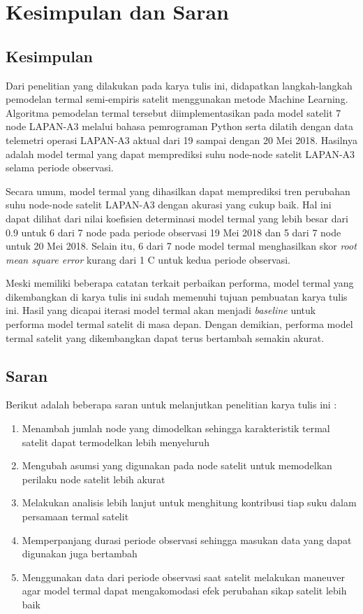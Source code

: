 \chapter{Kesimpulan dan Saran}

\section{Kesimpulan}

Dari penelitian yang dilakukan pada karya tulis ini, didapatkan langkah-langkah
pemodelan termal semi-empiris satelit menggunakan metode Machine Learning.
Algoritma pemodelan termal tersebut diimplementasikan pada model satelit 7 node
LAPAN-A3 melalui bahasa pemrograman Python serta dilatih dengan data telemetri
operasi LAPAN-A3 aktual dari 19 sampai dengan 20 Mei 2018. Hasilnya adalah model
termal yang dapat memprediksi suhu node-node satelit LAPAN-A3 selama periode
observasi.

Secara umum, model termal yang dihasilkan dapat memprediksi tren perubahan suhu
node-node satelit LAPAN-A3 dengan akurasi yang cukup baik. Hal ini dapat
dilihat dari nilai koefisien determinasi model termal yang lebih besar dari 0.9
untuk 6 dari 7 node pada periode observasi 19 Mei 2018 dan 5 dari 7 node untuk
20 Mei 2018. Selain itu, 6 dari 7 node model termal menghasilkan skor
\textit{root mean square error} kurang dari 1 \degree C untuk kedua periode observasi. 

Meski memiliki beberapa catatan terkait perbaikan performa, model termal yang
dikembangkan di karya tulis ini sudah memenuhi tujuan pembuatan karya tulis
ini. Hasil yang dicapai iterasi model termal akan menjadi \textit{baseline}
untuk performa model termal satelit di masa depan. Dengan demikian, performa
model termal satelit yang dikembangkan dapat terus bertambah semakin akurat.

\section{Saran}

Berikut adalah beberapa saran untuk melanjutkan penelitian karya tulis ini :

\begin{enumerate}
\item Menambah jumlah node yang dimodelkan sehingga karakteristik termal satelit dapat termodelkan lebih menyeluruh
\item Mengubah asumsi yang digunakan pada node satelit untuk memodelkan perilaku node satelit lebih akurat
\item Melakukan analisis lebih lanjut untuk menghitung kontribusi tiap suku dalam persamaan termal satelit
\item Memperpanjang durasi periode observasi sehingga masukan data yang dapat digunakan juga bertambah
\item Menggunakan data dari periode observasi saat satelit melakukan maneuver agar model termal dapat mengakomodasi efek perubahan sikap satelit lebih baik
\end{enumerate}
